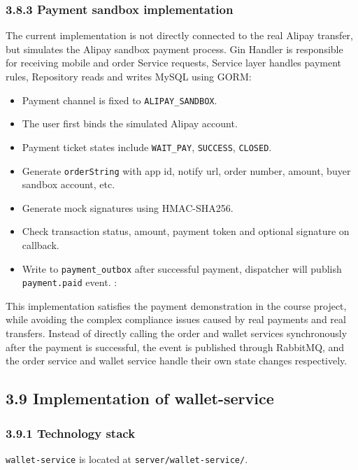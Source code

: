 \documentclass{article}
\begin{document}
\subsubsection{3.8.3 Payment sandbox implementation}

The current implementation is not directly connected to the real Alipay transfer, but simulates the Alipay sandbox payment process. Gin Handler is responsible for receiving mobile and order Service requests, Service layer handles payment rules, Repository reads and writes MySQL using GORM:

\begin{itemize}
    \item Payment channel is fixed to \texttt{ALIPAY\_SANDBOX}.
    \item The user first binds the simulated Alipay account.
    \item Payment ticket states include \texttt{WAIT\_PAY}, \texttt{SUCCESS}, \texttt{CLOSED}.
    \item Generate \texttt{orderString} with app id, notify url, order number, amount, buyer sandbox account, etc.
    \item Generate mock signatures using HMAC-SHA256.
    \item Check transaction status, amount, payment token and optional signature on callback.
    \item Write to \texttt{payment\_outbox} after successful payment, dispatcher will publish \texttt{payment.paid} event. :
\end{itemize}

This implementation satisfies the payment demonstration in the course project, while avoiding the complex compliance issues caused by real payments and real transfers. Instead of directly calling the order and wallet services synchronously after the payment is successful, the event is published through RabbitMQ, and the order service and wallet service handle their own state changes respectively.

\subsection{3.9 Implementation of wallet-service}

\subsubsection{3.9.1 Technology stack}

\texttt{wallet-service} is located at \texttt{server/wallet-service/}.
\end{document}
